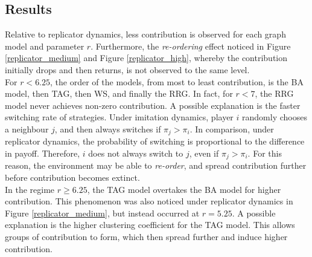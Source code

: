 \subsection{Results}
\FloatBarrier
{} 
\FloatBarrier
{}
\FloatBarrier
{}\FloatBarrier

Relative to replicator dynamics, less contribution is observed for each graph model and parameter $r$. Furthermore, the \emph{re-ordering} effect noticed in Figure \ref{replicator_medium} and Figure \ref{replicator_high}, whereby the contribution initially drops and then returns, is not observed to the same level. \\

For $r<6.25$, the order of the models, from most to least contribution, is the BA model, then TAG, then WS, and finally the RRG. In fact, for $r<7$, the RRG model never achieves non-zero contribution. A possible explanation is the faster switching rate of strategies. Under imitation dynamics, player $i$ randomly chooses a neighbour $j$, and then always switches if $\pi_j>\pi_i$. In comparison, under replicator dynamics, the probability of switching is proportional to the difference in payoff. Therefore, $i$ does not always switch to $j$, even if $\pi_j>\pi_i$. For this reason, the environment may be able to \emph{re-order}, and spread contribution further before contribution becomes extinct. \\

In the regime $r\geq 6.25$, the TAG model overtakes the BA model for higher contribution. This phenomenon was also noticed under replicator dynamics in Figure \ref{replicator_medium}, but instead occurred at $r=5.25$. A possible explanation is the higher clustering coefficient for the TAG model. This allows groups of contribution to form, which then spread further and induce higher contribution. \\

